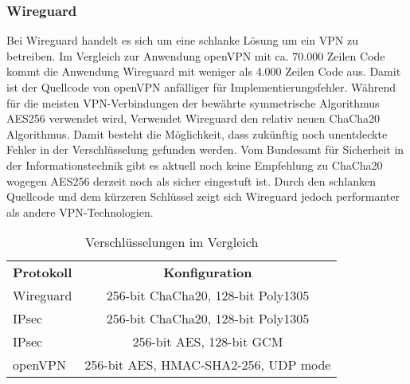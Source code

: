 \newpage
\subsubsection{Wireguard}

Bei Wireguard handelt es sich um eine schlanke L\"osung um ein \ac{VPN} zu betreiben. Im Vergleich zur Anwendung openVPN mit ca. 70.000 Zeilen Code kommt die Anwendung Wireguard mit weniger als 4.000 Zeilen Code aus. 
Damit ist der Quellcode von openVPN anf\"alliger f\"ur Implementierungsfehler. W\"ahrend f\"ur die meisten VPN-Verbindungen der bew\"ahrte symmetrische Algorithmus AES256 verwendet wird, Verwendet Wireguard den relativ neuen ChaCha20 Algorithmus. Damit besteht die M\"oglichkeit, dass zuk\"unftig noch unentdeckte Fehler in der Verschl\"usselung gefunden werden. Vom Bundesamt f\"ur Sicherheit in der Informationstechnik gibt es aktuell noch keine Empfehlung zu ChaCha20 wogegen AES256 derzeit noch als sicher eingestuft ist.  
Durch den schlanken Quellcode und dem k\"urzeren Schl\"ussel zeigt sich Wireguard jedoch performanter als andere VPN-Technologien.   

\begin{table}[ht]
   \begin{center}
      \begin{tabular}{lc}\toprule
         \textbf{Protokoll}	&\textbf{Konfiguration} \\ 	
         Wireguard	& 256-bit ChaCha20, 128-bit Poly1305 \\
         IPsec & 256-bit ChaCha20, 128-bit Poly1305 \\
         IPsec	& 256-bit AES, 128-bit GCM \\
         openVPN	& 256-bit AES, HMAC-SHA2-256, UDP mode \\
      \end{tabular}
   \end{center}
   \caption{Verschlüsselungen im Vergleich}
\end{table}


